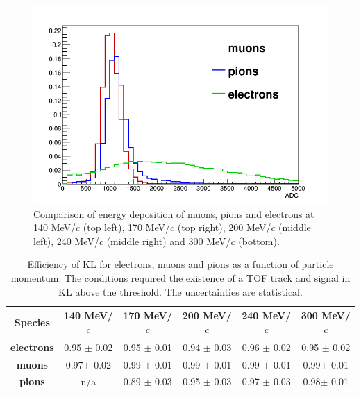 \begin{figure}[htb!]
\begin{center}
 		\includegraphics[width=0.45\columnwidth]{./04-KL/Figures/mu_vs_pi_vs_e_300MEV.png}
 		\caption{Comparison of energy deposition of muons, pions and electrons at 140 MeV/$c$ (top left), 170 MeV/$c$ (top right), 200 MeV/$c$ (middle left), 240 MeV/$c$ (middle right) and 300 MeV/$c$ (bottom).}
 		\label{fig:KL4}
 	\end{center}
\end{figure}

       
  \begin{table}[!htb]
  	\begin{center}
  		\begin{tabular}{c|c|c|c|c|c} 
  			\textbf{Species} &\textbf{140 MeV/$c$} & \textbf{170 MeV/$c$} & \textbf{200 MeV/$c$}	&\textbf{240 MeV/$c$} &\textbf{300 MeV/$c$}\\
  			\hline
  			\textbf{electrons} & 0.95 $\pm$ 0.02  & 0.95 $\pm$ 0.01 & 0.94 $\pm$ 0.03 &  0.96 $\pm$ 0.02 &  0.95 $\pm$ 0.02 \\
  			\hline
  			\textbf{muons} &  0.97$\pm$ 0.02 & 0.99 $\pm$ 0.01  & 0.99 $\pm$  0.01 & 0.99 $\pm$ 0.01 & 0.99$\pm$ 0.01\\
  			\hline
  			\textbf{pions} &  n/a  & 0.89 $\pm$ 0.03  & 0.95 $\pm$ 0.03 & 0.97 $\pm$ 0.03 & 0.98$\pm$ 0.01\\
  		\end{tabular}
  		\caption{Efficiency of KL for electrons, muons and pions as a function of particle momentum. The conditions required the existence of a TOF track and signal in KL above the threshold. The uncertainties are statistical.}
  		\label{tab:KL_eff}
  	\end{center}
  \end{table}

